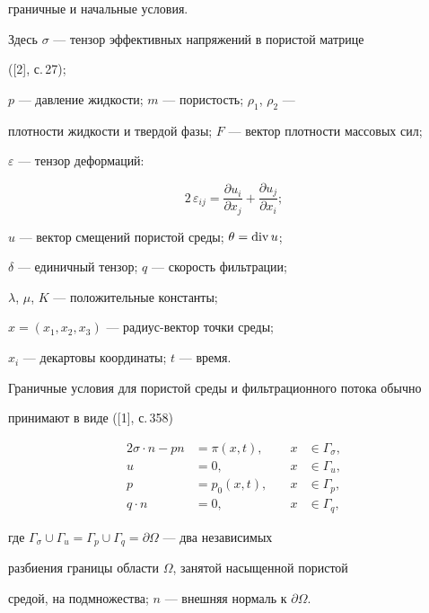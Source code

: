 граничные и начальные условия.


Здесь $\sigma$ --- тензор эффективных напряжений в пористой матрице


([2], с.\,27);


$p$ --- давление жидкости; $m$ --- пористость; $\rho_1$, $\rho_2$ ---


плотности жидкости и твердой фазы; $F$ --- вектор плотности массовых сил;


$\varepsilon$ --- тензор деформаций:


$$


2 \,\varepsilon_{ij}=\frac{\partial u_{i}}{\partial x_{j}}+


\frac{\partial u_{j}}{\partial x_{i}};


$$


$u$ --- вектор смещений пористой среды; $\theta =\operatorname{div} u$;


$\delta$ --- единичный тензор; $q$ --- скорость фильтрации;


$\lambda$, $\mu$, $K$ --- положительные константы;


$x=(x_1,x_2,x_3)$ --- радиус-вектор точки среды;


$x_i$ --- декартовы координаты; $t$ --- время.





Граничные условия для пористой среды и фильтрационного потока обычно


принимают в виде ([1], с.\,358)


\begin{alignat}{2}


\sigma \cdot n - pn &= \pi(x,t), &\quad x &\in \Gamma_{\sigma}, \\


u&=0, &\quad x &\in \Gamma_{u}, \\


p&=p_{0}(x,t), &\quad x &\in \Gamma_{p}, \\


q \cdot n&=0, &\quad x &\in \Gamma_{q},


\end{alignat}


где $\Gamma_{\sigma} \cup \Gamma_{u} =


\Gamma_{p} \cup \Gamma_{q} = \partial \Omega$ --- два независимых


разбиения границы области $\Omega$, занятой насыщенной пористой


средой, на подмножества; $n$ --- внешняя нормаль к $\partial \Omega$.






